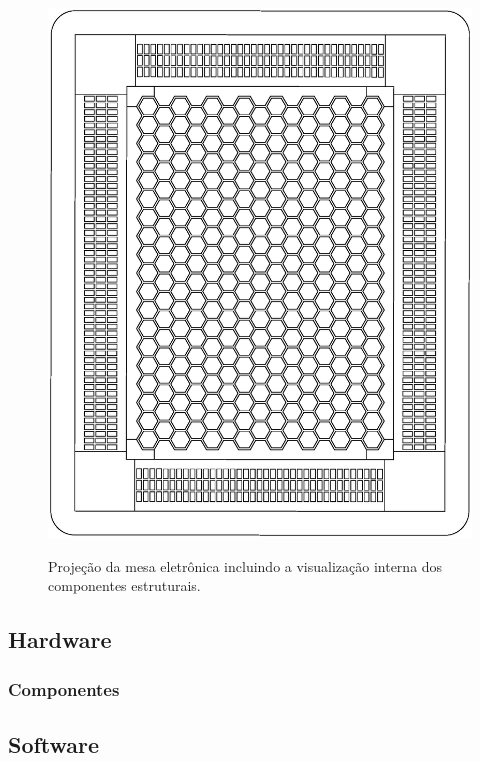 \documentclass[a4paper,10pt]{article}
\begin{document}
\begin{center}
\begin{figure}[h!]
	\center
	\includegraphics[angle=0, scale=0.40]{./img/projeto-v02.ps}
	\label{figura_projeto}
	\caption{Projeção da mesa eletrônica incluindo a visualização interna dos componentes estruturais.}
\end{figure}
\end{center}


\subsection{Hardware}

\subsubsection{Componentes}

\subsection{Software}
\end{document}
